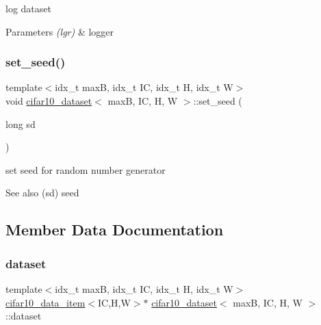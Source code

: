 log dataset 


\begin{DoxyParams}{Parameters}
{\em (lgr)} & logger \\
\hline
\end{DoxyParams}
\mbox{\label{structcifar10__dataset_a90bb8f4e440939589db017dbc89004c4}} 
\subsubsection{\texorpdfstring{set\+\_\+seed()}{set\_seed()}}
{\footnotesize\ttfamily template$<$idx\+\_\+t maxB, idx\+\_\+t IC, idx\+\_\+t H, idx\+\_\+t W$>$ \\
void \hyperlink{structcifar10__dataset}{cifar10\+\_\+dataset}$<$ maxB, IC, H, W $>$\+::set\+\_\+seed (\begin{DoxyParamCaption}\item[{long}]{sd }\end{DoxyParamCaption})\hspace{0.3cm}{\ttfamily [inline]}}



set seed for random number generator 

\begin{DoxySeeAlso}{See also}
(sd) seed 
\end{DoxySeeAlso}


\subsection{Member Data Documentation}
\mbox{\label{structcifar10__dataset_a8c4071c746bf18e875b9e7975c7929fd}} 
\subsubsection{\texorpdfstring{dataset}{dataset}}
{\footnotesize\ttfamily template$<$idx\+\_\+t maxB, idx\+\_\+t IC, idx\+\_\+t H, idx\+\_\+t W$>$ \\
\hyperlink{structcifar10__data__item}{cifar10\+\_\+data\+\_\+item}$<$IC,H,W$>$$\ast$ \hyperlink{structcifar10__dataset}{cifar10\+\_\+dataset}$<$ maxB, IC, H, W $>$\+::dataset}

